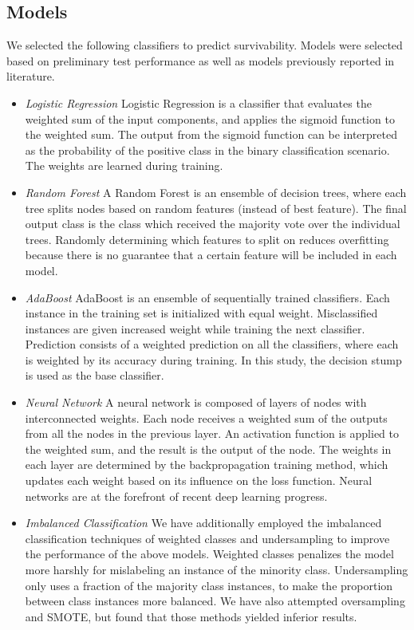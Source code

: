 \documentclass[review]{elsarticle}
\begin{document}
\subsection*{Models}
We selected the following classifiers to predict survivability. Models were selected based on preliminary test performance as well as models previously reported in literature.
\begin{itemize}
	\item \textit{Logistic Regression} Logistic Regression is a classifier that evaluates the weighted sum of the input components, and applies the sigmoid function to the weighted sum. The output from the sigmoid function can be interpreted as the probability of the positive class in the binary classification scenario. The weights are learned during training.
	\item \textit{Random Forest} A Random Forest is an ensemble of decision trees, where each tree splits nodes based on random features (instead of best feature). The final output class is the class which received the majority vote over the individual trees. Randomly determining which features to split on reduces overfitting because there is no guarantee that a certain feature will be included in each model. 
	\item \textit{AdaBoost} AdaBoost\cite{freund1999short} is an ensemble of sequentially trained classifiers. Each instance in the training set is initialized with equal weight. Misclassified instances are given increased weight while training the next classifier. Prediction consists of a weighted prediction on all the classifiers, where each is weighted by its accuracy during training. In this study, the decision stump is used as the base classifier.
	\item \textit {Neural Network} A neural network is composed of layers of nodes with interconnected weights. Each node receives a weighted sum of the outputs from all the nodes in the previous layer. An activation function is applied to the weighted sum, and the result is the output of the node. The weights in each layer are determined by the backpropagation training method, which updates each weight based on its influence on the loss function. Neural networks are at the forefront of recent deep learning progress.
	\item \textit {Imbalanced Classification} We have additionally employed the imbalanced classification techniques of weighted classes and undersampling to improve the performance of the above models. Weighted classes penalizes the model more harshly for mislabeling an instance of the minority class. Undersampling only uses a fraction of the majority class instances, to make the proportion between class instances more balanced\cite{he2008learning}. We have also attempted oversampling and SMOTE, but found that those methods yielded inferior results.
	
\end{itemize}
\end{document}
